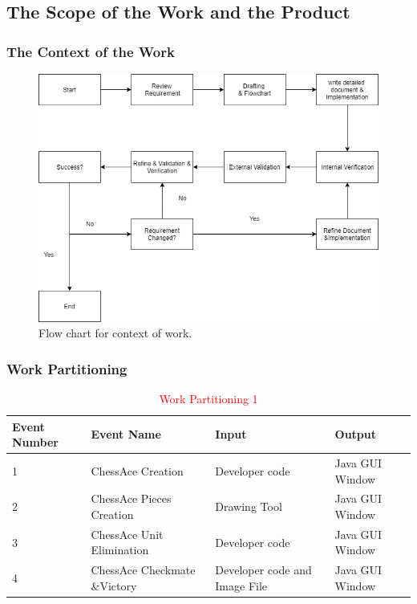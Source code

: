 \documentclass[12pt, titlepage]{article}
\begin{document}
\subsection{The Scope of the Work and the Product}

\subsubsection{The Context of the Work}
\begin{figure}[H]
  \includegraphics[width=\linewidth]{WorkContext.png}
  \caption{Flow chart for context of work.}
  \label{fig:context}
\end{figure}

\subsubsection{Work Partitioning}
\begin{table}[H]
\footnotesize
\begin{center}
\begin{tabular}{| l | l | l | l |}
\hline
\textbf{Event Number} & \textbf{Event Name} & \textbf{Input} & \textbf{Output}\\
\hline
1 & ChessAce Creation & Developer code & Java GUI Window\\
\hline
2 & ChessAce Pieces Creation & Drawing Tool & Java GUI Window\\
\hline
3 & ChessAce Unit Elimination & Developer code & Java GUI Window\\
\hline
4 & ChessAce Checkmate \&Victory & Developer code and Image File &  Java GUI Window\\
\hline    
\end{tabular}
\normalsize
\caption{\textcolor{red}{Work Partitioning 1}}
   \label{tab:table}
\end{center}
\end{table}
\end{document}

